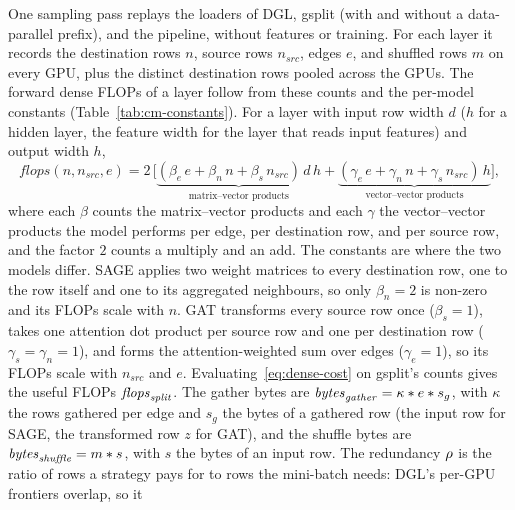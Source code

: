 One sampling pass replays the loaders of DGL, gsplit (with and without a data-parallel prefix), and
the pipeline, without features or training. For each layer it records the destination rows $n$,
source rows $n_{\mathit{src}}$, edges $e$, and shuffled rows $m$ on every GPU, plus the distinct
destination rows pooled across the GPUs. 
The forward dense FLOPs of a layer follow from these counts and the per-model constants
(Table~\ref{tab:cm-constants}). For a layer with input row width $d$ ($h$ for a hidden layer, the
feature width for the layer that reads input features) and output width $h$,
\begin{equation}
  \mathit{flops}(n, n_{\mathit{src}}, e) =
  2\,\Big[\underbrace{(\beta_e\, e + \beta_n\, n + \beta_s\, n_{\mathit{src}})\, d\, h}_{\text{matrix--vector products}}
        +\underbrace{(\gamma_e\, e + \gamma_n\, n + \gamma_s\, n_{\mathit{src}})\, h}_{\text{vector--vector products}}\Big] ,
  \label{eq:dense-cost}
\end{equation}
where each $\beta$ counts the matrix--vector products and each $\gamma$ the vector--vector products
the model performs per edge, per destination row, and per source row, and the factor $2$ counts a
multiply and an add. The constants are where the two models differ. SAGE applies two weight matrices
to every destination row, one to the row itself and one to its aggregated neighbours, so only
$\beta_n=2$ is non-zero and its FLOPs scale with $n$. GAT transforms every source row once
($\beta_s=1$), takes one attention dot product per source row and one per destination row
($\gamma_s=\gamma_n=1$), and forms the attention-weighted sum over edges ($\gamma_e=1$), so its FLOPs
scale with $n_{\mathit{src}}$ and $e$. Evaluating~\eqref{eq:dense-cost} on gsplit's counts gives the
useful FLOPs $\mathit{flops}_{\mathit{split}}$. The gather bytes are $\mathit{bytes}_{\mathit{gather}}=\kappa\ast e\ast s_g$, with $\kappa$ the rows
gathered per edge and $s_g$ the bytes of a gathered row (the input row for SAGE, the transformed row
$z$ for GAT), and the shuffle bytes are $\mathit{bytes}_{\mathit{shuffle}}=m\ast s$, with $s$ the bytes of an input row.  The
redundancy $\rho$ is the ratio
of rows a strategy pays for to rows the mini-batch needs: DGL's per-GPU frontiers overlap, so it
